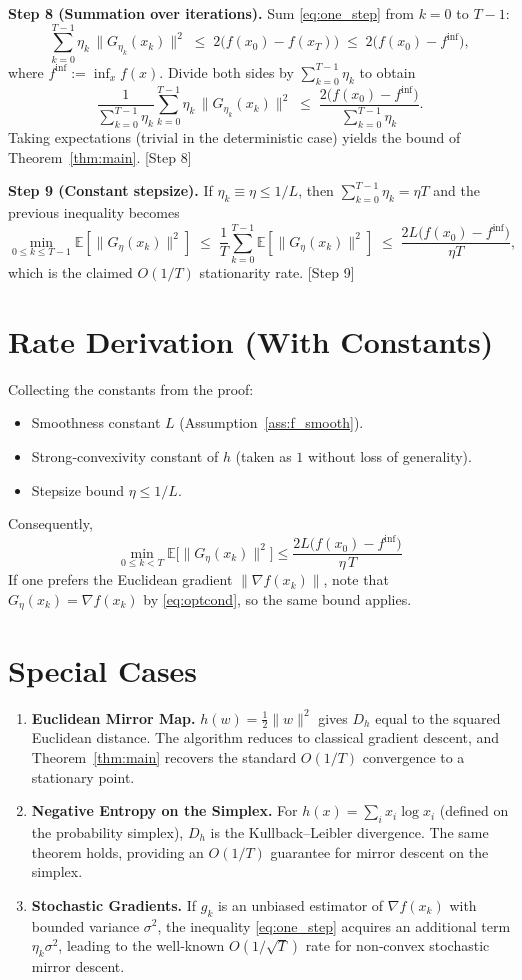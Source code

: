\documentclass{article}
\newcommand{\EE}{\mathbb{E}}
\newcommand{\grad}{\nabla}
\newcommand{\Breg}{D_{h}}
\begin{document}
\noindent\textbf{Step 8 (Summation over iterations).}  
Sum \eqref{eq:one_step} from $k=0$ to $T-1$:
\[
\sum_{k=0}^{T-1}\eta_{k}\,\|G_{\eta_{k}}(x_{k})\|^{2}\;\le\;2\bigl(f(x_{0})-f(x_{T})\bigr)
\;\le\;2\bigl(f(x_{0})-f^{\inf}\bigr),
\]
where $f^{\inf}:=\inf_{x}f(x)$. Divide both sides by $\sum_{k=0}^{T-1}\eta_{k}$ to obtain
\[
\frac{1}{\sum_{k=0}^{T-1}\eta_{k}}\sum_{k=0}^{T-1}\eta_{k}\,\|G_{\eta_{k}}(x_{k})\|^{2}
\;\le\;\frac{2\bigl(f(x_{0})-f^{\inf}\bigr)}{\sum_{k=0}^{T-1}\eta_{k}}.
\]
Taking expectations (trivial in the deterministic case) yields the bound of Theorem~\ref{thm:main}.
\hfill[Step 8]

\noindent\textbf{Step 9 (Constant stepsize).}  
If $\eta_{k}\equiv\eta\le1/L$, then $\sum_{k=0}^{T-1}\eta_{k}= \eta T$ and the previous inequality becomes
\[
\min_{0\le k\le T-1}\EE\!\left[\|G_{\eta}(x_{k})\|^{2}\right]
\;\le\;\frac{1}{T}\sum_{k=0}^{T-1}\EE\!\left[\|G_{\eta}(x_{k})\|^{2}\right]
\;\le\;\frac{2L\bigl(f(x_{0})-f^{\inf}\bigr)}{\eta T},
\]
which is the claimed $O(1/T)$ stationarity rate.
\hfill[Step 9]

\section*{Rate Derivation (With Constants)}
Collecting the constants from the proof:
\begin{itemize}
\item Smoothness constant $L$ (Assumption~\ref{ass:f_smooth}).
\item Strong‑convexivity constant of $h$ (taken as $1$ without loss of generality).
\item Stepsize bound $\eta\le1/L$.
\end{itemize}
Consequently,
\[
\boxed{\displaystyle
\min_{0\le k<T}\EE\!\bigl[\|G_{\eta}(x_{k})\|^{2}\bigr]
\le
\frac{2L\bigl(f(x_{0})-f^{\inf}\bigr)}{\eta\,T}
}
\]
If one prefers the Euclidean gradient $\|\grad f(x_{k})\|$, note that $G_{\eta}(x_{k})=\grad f(x_{k})$ by \eqref{eq:optcond}, so the same bound applies.

\section*{Special Cases}
\begin{enumerate}
\item \textbf{Euclidean Mirror Map.} $h(w)=\tfrac12\|w\|^{2}$ gives $\Breg$ equal to the squared Euclidean distance. The algorithm reduces to classical gradient descent, and Theorem~\ref{thm:main} recovers the standard $O(1/T)$ convergence to a stationary point.
\item \textbf{Negative Entropy on the Simplex.} For $h(x)=\sum_{i}x_{i}\log x_{i}$ (defined on the probability simplex), $\Breg$ is the Kullback–Leibler divergence. The same theorem holds, providing an $O(1/T)$ guarantee for mirror descent on the simplex.
\item \textbf{Stochastic Gradients.} If $g_{k}$ is an unbiased estimator of $\grad f(x_{k})$ with bounded variance $\sigma^{2}$, the inequality \eqref{eq:one_step} acquires an additional term $\eta_{k}\sigma^{2}$, leading to the well‑known $O(1/\sqrt{T})$ rate for non‑convex stochastic mirror descent.
\end{enumerate}
\end{document}
